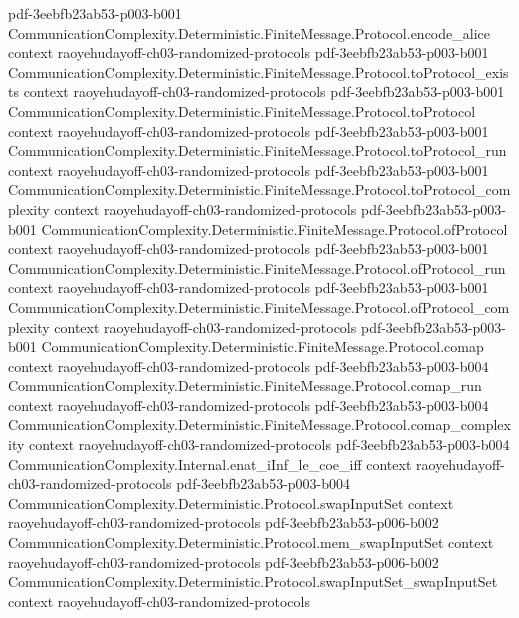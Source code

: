 \begin{theorem}
  {pdf-3eebfb23ab53-p003-b001}
\proofstep
  {CommunicationComplexity.Deterministic.FiniteMessage.Protocol.encode_alice}
  {context}
  {raoyehudayoff-ch03-randomized-protocols}
  {pdf-3eebfb23ab53-p003-b001}
\proofstep
  {CommunicationComplexity.Deterministic.FiniteMessage.Protocol.toProtocol_exists}
  {context}
  {raoyehudayoff-ch03-randomized-protocols}
  {pdf-3eebfb23ab53-p003-b001}
\proofstep
  {CommunicationComplexity.Deterministic.FiniteMessage.Protocol.toProtocol}
  {context}
  {raoyehudayoff-ch03-randomized-protocols}
  {pdf-3eebfb23ab53-p003-b001}
\proofstep
  {CommunicationComplexity.Deterministic.FiniteMessage.Protocol.toProtocol_run}
  {context}
  {raoyehudayoff-ch03-randomized-protocols}
  {pdf-3eebfb23ab53-p003-b001}
\proofstep
  {CommunicationComplexity.Deterministic.FiniteMessage.Protocol.toProtocol_complexity}
  {context}
  {raoyehudayoff-ch03-randomized-protocols}
  {pdf-3eebfb23ab53-p003-b001}
\proofstep
  {CommunicationComplexity.Deterministic.FiniteMessage.Protocol.ofProtocol}
  {context}
  {raoyehudayoff-ch03-randomized-protocols}
  {pdf-3eebfb23ab53-p003-b001}
\proofstep
  {CommunicationComplexity.Deterministic.FiniteMessage.Protocol.ofProtocol_run}
  {context}
  {raoyehudayoff-ch03-randomized-protocols}
  {pdf-3eebfb23ab53-p003-b001}
\proofstep
  {CommunicationComplexity.Deterministic.FiniteMessage.Protocol.ofProtocol_complexity}
  {context}
  {raoyehudayoff-ch03-randomized-protocols}
  {pdf-3eebfb23ab53-p003-b001}
\proofstep
  {CommunicationComplexity.Deterministic.FiniteMessage.Protocol.comap}
  {context}
  {raoyehudayoff-ch03-randomized-protocols}
  {pdf-3eebfb23ab53-p003-b004}
\proofstep
  {CommunicationComplexity.Deterministic.FiniteMessage.Protocol.comap_run}
  {context}
  {raoyehudayoff-ch03-randomized-protocols}
  {pdf-3eebfb23ab53-p003-b004}
\proofstep
  {CommunicationComplexity.Deterministic.FiniteMessage.Protocol.comap_complexity}
  {context}
  {raoyehudayoff-ch03-randomized-protocols}
  {pdf-3eebfb23ab53-p003-b004}
\proofstep
  {CommunicationComplexity.Internal.enat_iInf_le_coe_iff}
  {context}
  {raoyehudayoff-ch03-randomized-protocols}
  {pdf-3eebfb23ab53-p003-b004}
\proofstep
  {CommunicationComplexity.Deterministic.Protocol.swapInputSet}
  {context}
  {raoyehudayoff-ch03-randomized-protocols}
  {pdf-3eebfb23ab53-p006-b002}
\proofstep
  {CommunicationComplexity.Deterministic.Protocol.mem_swapInputSet}
  {context}
  {raoyehudayoff-ch03-randomized-protocols}
  {pdf-3eebfb23ab53-p006-b002}
\proofstep
  {CommunicationComplexity.Deterministic.Protocol.swapInputSet_swapInputSet}
  {context}
  {raoyehudayoff-ch03-randomized-protocols}

\end{theorem}
